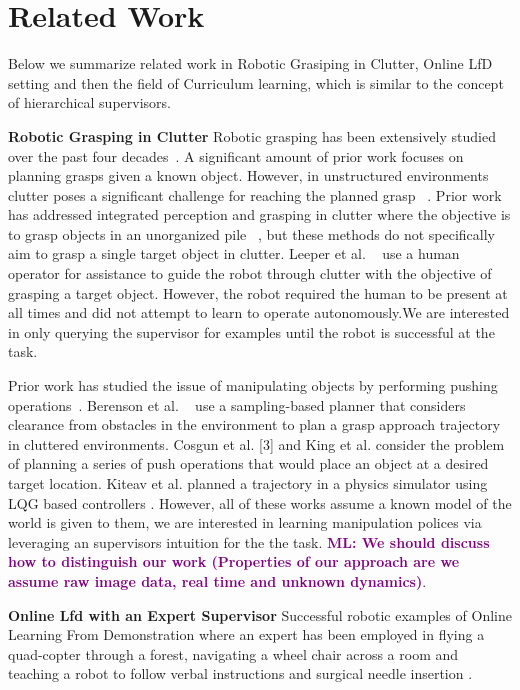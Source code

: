 \documentclass[10pt, conference]{ieeeconf}      %
\newcommand{\mlnote}[1]{\ifthenelse{ \boolean{include-notes}}%
 {\textcolor{purple}{\textbf{ML: #1}}}{}}
\begin{document}
\section{Related Work}
Below we summarize related work in Robotic Grasiping in Clutter,  Online LfD setting and then the field of Curriculum learning, which is similar to the concept of hierarchical supervisors.

\noindent \textbf{Robotic Grasping in Clutter}
Robotic grasping has been extensively studied over the
past four decades~\cite{bicchi2000robotic}. A significant amount of prior work focuses on planning grasps given a known object.  However, in unstructured environments clutter poses a significant challenge for reaching the planned grasp ~\cite{katz2008can}.
Prior work has addressed integrated perception and grasping
in clutter where the objective is to grasp objects in an
unorganized pile ~\cite{pinto2015supersizing,nieuwenhuisen2013mobile}, but these
methods do not specifically aim to grasp a single target object
in clutter. 
Leeper et al. ~\cite{} use a human operator for assistance to guide the
robot through clutter with the objective of grasping a target
object. However, the robot required the human to be present at all times and did not attempt to learn to operate autonomously.We are interested in only querying the supervisor for examples until the robot is successful at the task. 

Prior work has studied the issue of manipulating objects
by performing pushing operations~\cite{}. Berenson et
al. ~\cite{} use a sampling-based planner that considers clearance
from obstacles in the environment to plan a grasp
approach trajectory in cluttered environments. Cosgun et al.
[3] and King et al. \cite{kingnonprehensile} consider the problem of planning
a series of push operations that would place an object at a
desired target location. Kiteav et al. planned a trajectory in a physics simulator using LQG based controllers \cite{kitaevphysics}. However, all of these works assume a known model of the world is given to them, we are interested in learning manipulation polices via leveraging an supervisors intuition for the the task.  \mlnote{We should discuss how to distinguish our work (Properties of our approach are we assume raw image data, real time and unknown dynamics)}. 

 


\noindent \textbf{Online Lfd with an Expert Supervisor}
Successful robotic examples of Online Learning From Demonstration where an expert has been employed in flying a quad-copter through a forest, navigating a wheel chair across a room and teaching a robot to follow verbal instructions and surgical needle insertion \cite{ross2013learning, kim2013maximum, duvallet2013imitation, laskey}. 
\end{document}
